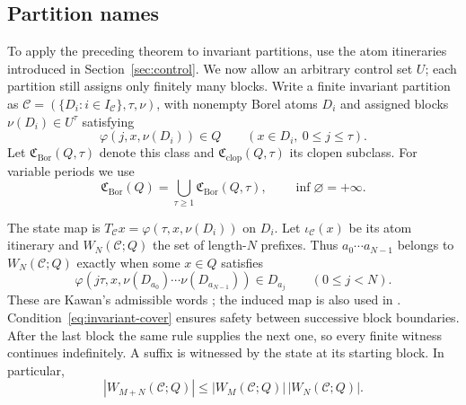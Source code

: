 \documentclass[11pt,reqno]{amsart}
\numberwithin{equation}{section}
\theoremstyle{definition}
\theoremstyle{definition}
\newcommand{\C}{\mathcal C}
\newcommand{\Bor}{\mathrm{Bor}}
\newcommand{\clop}{\mathrm{clop}}
\begin{document}
\subsection{Partition names}\label{sec:partition-names}
To apply the preceding theorem to invariant partitions, use the atom
itineraries introduced in Section~\ref{sec:control}. We now allow an
arbitrary control set $U$; each partition still assigns only finitely
many blocks. Write a finite invariant partition as
$\C=(\{D_i:i\in I_\C\},\tau,\nu)$, with nonempty Borel atoms
$D_i$ and assigned blocks $\nu(D_i)\in U^\tau$ satisfying
\begin{equation}\label{eq:invariant-cover}
 \varphi(j,x,\nu(D_i))\in Q
       \qquad(x\in D_i,\ 0\le j\le\tau).
\end{equation}
Let $\mathfrak C_{\Bor}(Q,\tau)$ denote this class and
$\mathfrak C_{\clop}(Q,\tau)$ its clopen subclass. For variable
periods we use
\[
 \mathfrak C_{\Bor}(Q)=\bigcup_{\tau\ge1}\mathfrak C_{\Bor}(Q,\tau),
 \qquad \inf\varnothing=+\infty.
\]

The state map is $T_\C x=\varphi(\tau,x,\nu(D_i))$ on $D_i$.
Let $\iota_\C(x)$ be its atom itinerary and $W_N(\C;Q)$ the
set of length-$N$ prefixes. Thus $a_0\cdots a_{N-1}$ belongs to
$W_N(\C;Q)$ exactly when some $x\in Q$ satisfies
\begin{equation}\label{eq:admissible-word}
 \varphi(j\tau,x,\nu(D_{a_0})\cdots\nu(D_{a_{N-1}}))
       \in D_{a_j}\qquad(0\le j<N).
\end{equation}
These are Kawan's admissible words \cite[Definition~2.9]{Kawan2013};
the induced map is also used in \cite[Section~2]{TomarKawanZamani2022}.
Condition~\eqref{eq:invariant-cover} ensures safety between successive
block boundaries. After the last block the same rule supplies the next
one, so every finite witness continues indefinitely. A suffix is
witnessed by the state at its starting block. In particular,
\begin{equation}\label{eq:word-submult}
 |W_{M+N}(\C;Q)|\le |W_M(\C;Q)|\,|W_N(\C;Q)|.
\end{equation}
\end{document}
